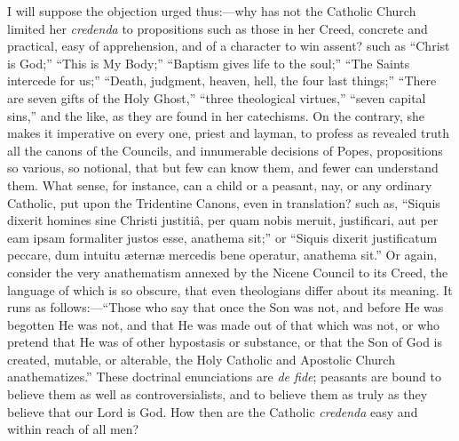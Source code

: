 I will suppose the objection urged thus:—why has not the Catholic
Church limited her \emph{credenda} to propositions such as those in
her Creed, concrete and practical, easy of apprehension, and of a
character to win assent? such as ``Christ is God;'' ``This
is My Body;'' ``Baptism gives life to the soul;''
``The Saints intercede for us;'' ``Death, judgment,
heaven, hell, the four last things;'' ``There are seven gifts
of the Holy Ghost,'' ``three theological virtues,''
``seven capital sins,'' and the like, as they are found in her
catechisms. On the contrary, she makes it imperative on every
one, priest and layman, to profess as revealed truth all the canons of
the Councils, and innumerable decisions of Popes, propositions so
various, so notional, that but few can know them, and fewer can
understand them. What sense, for instance, can a child or a peasant,
nay, or any ordinary Catholic, put upon the Tridentine Canons, even in
translation? such as, ``Siquis dixerit homines sine Christi
justitiâ, per quam nobis meruit, justificari, aut per eam ipsam
formaliter justos esse, anathema sit;'' or ``Siquis dixerit
justificatum peccare, dum intuitu æternæ mercedis bene operatur,
anathema sit.'' Or again, consider the very anathematism annexed
by the Nicene Council to its Creed, the language of which is so
obscure, that even theologians differ about its meaning. It runs as
follows:—``Those who say that once the Son was not, and before
He was begotten He was not, and that He was made out of that which was
not, or who pretend that He was of other hypostasis or substance, or
that the Son of God is created, mutable, or alterable, the Holy
Catholic and Apostolic Church anathematizes.'' These doctrinal
enunciations are \emph{de fide}; peasants are bound to believe them as
well as controversialists, and to believe them as truly as they
believe that our Lord is God. How then are the Catholic \emph{credenda}
easy and within reach of all men?


